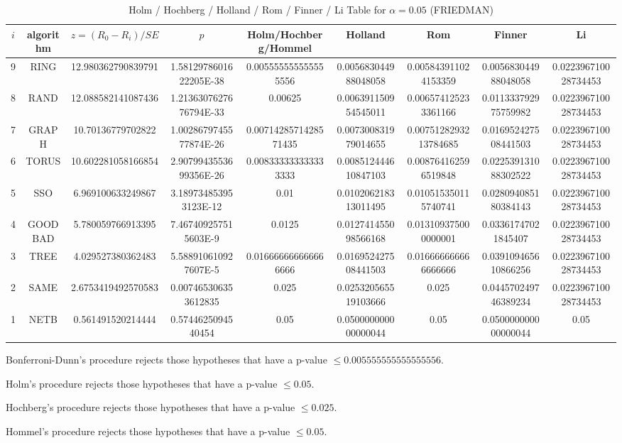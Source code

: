 \documentclass[a4paper,10pt]{article}
\begin{document}
\begin{landscape}
\begin{table}[!htp]
\centering\scriptsize
\caption{Holm / Hochberg / Holland / Rom / Finner / Li Table for $\alpha=0.05$ (FRIEDMAN)}
\begin{tabular}{ccccccccc}
$i$&algorithm&$z=(R_0 - R_i)/SE$&$p$&Holm/Hochberg/Hommel&Holland&Rom&Finner&Li\\
\hline
9& RING&12.980362790839791&1.5812978601622205E-38&0.005555555555555556&0.005683044988048058&0.005843911024153359&0.005683044988048058&0.022396710028734453\\
8& RAND&12.088582141087436&1.2136307627676794E-33&0.00625&0.006391150954545011&0.006574125233361166&0.011333792975759982&0.022396710028734453\\
7& GRAPH&10.70136779702822&1.0028679745577874E-26&0.0071428571428571435&0.007300831979014655&0.0075128293213784685&0.016952427508441503&0.022396710028734453\\
6& TORUS&10.602281058166854&2.9079943553699356E-26&0.008333333333333333&0.008512444610847103&0.008764162596519848&0.022539131088302522&0.022396710028734453\\
5& SSO&6.969100633249867&3.189734853953123E-12&0.01&0.010206218313011495&0.010515350115740741&0.028094085180384143&0.022396710028734453\\
4& GOODBAD&5.780059766913395&7.467409257515603E-9&0.0125&0.012741455098566168&0.013109375000000001&0.03361747021845407&0.022396710028734453\\
3& TREE&4.029527380362483&5.588910610927607E-5&0.016666666666666666&0.016952427508441503&0.016666666666666666&0.039109465610866256&0.022396710028734453\\
2& SAME&2.6753419492570583&0.007465306353612835&0.025&0.025320565519103666&0.025&0.044570249746389234&0.022396710028734453\\
1& NETB&0.561491520214444&0.5744625094540454&0.05&0.050000000000000044&0.05&0.050000000000000044&0.05\\
\hline
\end{tabular}
\end{table}
Bonferroni-Dunn's procedure rejects those hypotheses that have a p-value $\le0.005555555555555556$.


Holm's procedure rejects those hypotheses that have a p-value $\le0.05$.


Hochberg's procedure rejects those hypotheses that have a p-value $\le0.025$.


Hommel's procedure rejects those hypotheses that have a p-value $\le0.05$.



\end{landscape}
\end{document}
